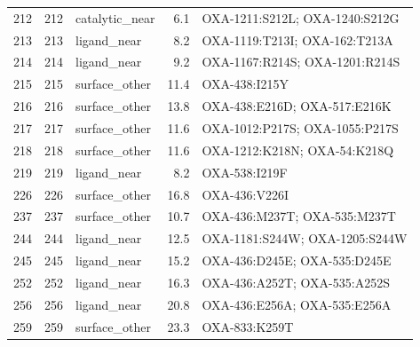 \begin{longtable}{rrlrl}
212&212&catalytic\_near&6.1&OXA-1211:S212L; OXA-1240:S212G\\
213&213&ligand\_near&8.2&OXA-1119:T213I; OXA-162:T213A\\
214&214&ligand\_near&9.2&OXA-1167:R214S; OXA-1201:R214S\\
215&215&surface\_other&11.4&OXA-438:I215Y\\
216&216&surface\_other&13.8&OXA-438:E216D; OXA-517:E216K\\
217&217&surface\_other&11.6&OXA-1012:P217S; OXA-1055:P217S\\
218&218&surface\_other&11.6&OXA-1212:K218N; OXA-54:K218Q\\
219&219&ligand\_near&8.2&OXA-538:I219F\\
226&226&surface\_other&16.8&OXA-436:V226I\\
237&237&surface\_other&10.7&OXA-436:M237T; OXA-535:M237T\\
244&244&ligand\_near&12.5&OXA-1181:S244W; OXA-1205:S244W\\
245&245&ligand\_near&15.2&OXA-436:D245E; OXA-535:D245E\\
252&252&ligand\_near&16.3&OXA-436:A252T; OXA-535:A252S\\
256&256&ligand\_near&20.8&OXA-436:E256A; OXA-535:E256A\\
259&259&surface\_other&23.3&OXA-833:K259T\\
\hline\end{longtable}
